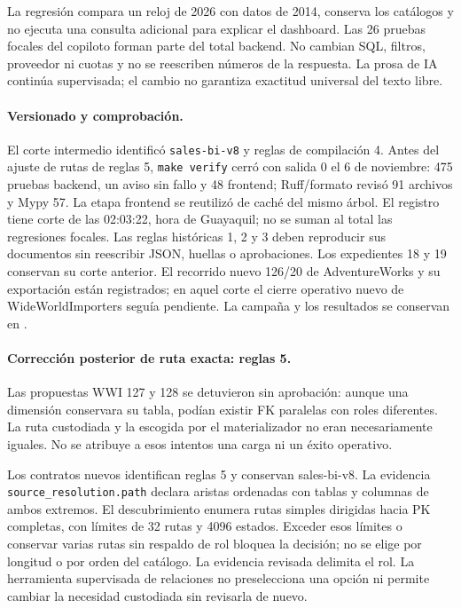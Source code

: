 \documentclass[11pt,letterpaper]{article}
\newcommand{\file}[1]{\texttt{#1}}
\begin{document}
La regresión compara un reloj de 2026 con datos de 2014, conserva los catálogos y
no ejecuta una consulta adicional para explicar el dashboard. Las 26 pruebas
focales del copiloto forman parte del total backend. No cambian SQL, filtros,
proveedor ni cuotas y no se reescriben números de la respuesta. La prosa de IA
continúa supervisada; el cambio no garantiza exactitud universal del texto libre.

\paragraph{Versionado y comprobación.}
El corte intermedio identificó \file{sales-bi-v8} y reglas de compilación 4.
Antes del ajuste de rutas de reglas 5, \file{make verify} cerró con salida 0 el 6 de noviembre: 475 pruebas backend,
un aviso sin fallo y 48 frontend; Ruff/formato revisó 91 archivos y Mypy 57.
La etapa frontend se reutilizó de caché del mismo árbol. El registro
 tiene corte de las 02:03:22,
hora de Guayaquil; no se suman al total las regresiones focales. Las reglas históricas 1, 2 y 3 deben
reproducir sus documentos sin reescribir JSON, huellas o aprobaciones. Los
expedientes 18 y 19 conservan su corte anterior. El recorrido nuevo 126/20 de AdventureWorks y su exportación están registrados;
en aquel corte el cierre operativo nuevo de WideWorldImporters seguía pendiente. La campaña y
los resultados se conservan en
.

\paragraph{Corrección posterior de ruta exacta: reglas 5.}
Las propuestas WWI 127 y 128 se detuvieron sin aprobación: aunque una dimensión
conservara su tabla, podían existir FK paralelas con roles diferentes. La ruta
custodiada y la escogida por el materializador no eran necesariamente iguales.
No se atribuye a esos intentos una carga ni un éxito operativo.

Los contratos nuevos identifican reglas 5 y conservan sales-bi-v8. La evidencia
\file{source\_resolution.path} declara aristas ordenadas con tablas y columnas de
ambos extremos. El descubrimiento enumera rutas simples dirigidas hacia PK
completas, con límites de 32 rutas y 4096 estados. Exceder esos límites o conservar
varias rutas sin respaldo de rol bloquea la decisión; no se elige por longitud o
por orden del catálogo. La evidencia revisada delimita el rol. La herramienta
supervisada de relaciones no preselecciona una opción ni permite cambiar la
necesidad custodiada sin revisarla de nuevo.
\end{document}
